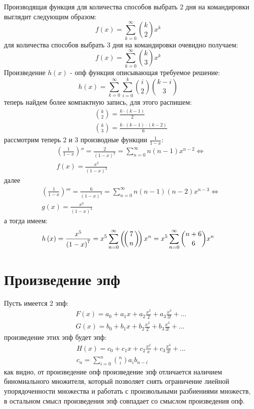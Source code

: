 Производящая функция для количества способов выбрать 2 дня на командировки выглядит следующим образом:
\[
	f\left(x\right) = \sum_{k=0}^\infty \binom{k}{2} x^k
\]
для количества способов выбрать 3 дня на командировки очевидно получаем:
\[
	f\left(x\right) = \sum_{k=0}^\infty \binom{k}{3} x^k
\]
Произведение $h\left(x\right)$ - опф функция описывающая требуемое решение:
\[
	h\left(x\right) = \sum_{k=0}^\infty \sum_{i=0}^k \binom{i}{2}\binom{k-i}{3}
\]
теперь найдем более компактную запись, для этого распишем:
\[
	\begin{split}
		&\binom{k}{2} = \frac{k\cdot\left(k-1\right)}{2} \\
		&\binom{k}{3} = \frac{k\cdot\left(k-1\right)\cdot\left(k-2\right)}{6}
	\end{split}
\]
рассмотрим теперь 2 и 3 производные функции $\frac{1}{1-x}$:
\[
	\begin{split}
		&\left(\frac{1}{1-x}\right)'' = \frac{2}{\left(1-x\right)^3} = \sum_{n=0}^\infty n\left(n-1\right) x^{n-2} \Leftrightarrow \\
		& f\left(x\right) = \frac{x^2}{\left(1-x\right)^3}
	\end{split}
\]
далее
\[
	\begin{split}
		&\left(\frac{1}{1-x}\right)''' = \frac{6}{\left(1-x\right)^4} = \sum_{n=0}^\infty n\left(n-1\right)\left(n-2\right)x^{n-3} \Leftrightarrow \\
		& g\left(x\right) = \frac{x^3}{\left(1-x\right)^4}
	\end{split}
\]
а тогда имеем:
\[
	\begin{split}
		h\left(x\right) = \frac{x^5}{\left(1-x\right)^7} = x^5 \sum_{n=0}^\infty \left(\negmedspace\left({{7}\atop{n}}\right)\negmedspace\right) x^n = x^5\sum_{n=0}^\infty \binom{n+6}{6} x^n
	\end{split}
\]
\section{Произведение эпф}

Пусть имеется 2 эпф:
\[
	\begin{split}
		& F\left(x\right) = a_0 + a_1 x + a_2 \frac{x^2}{2} + a_3 \frac{x^3}{3!} + ...\\
		& G\left(x\right) = b_0 + b_1 x + b_2 \frac{x^2}{2} + b_3 \frac{x^3}{3!} + ...
	\end{split}
\]
произведение этих эпф будет эпф:
\[
	\begin{split}
		& H\left(x\right) = c_0 + c_1 x + c_2 \frac{x^2}{x} + c_3 \frac{x^3}{3!} + ...\\
		& c_n = \sum_{i=0}^n \binom{n}{i}a_ib_{n-i}
	\end{split}
\]
как видно, от произведение опф произведение эпф отличается наличием биномиального множителя, который позволяет снять ограничение лиейной упорядоченности множества и работать с произвольными разбиениями множеств, в остальном смысл произведения эпф совпадает со смыслом произведения опф.

